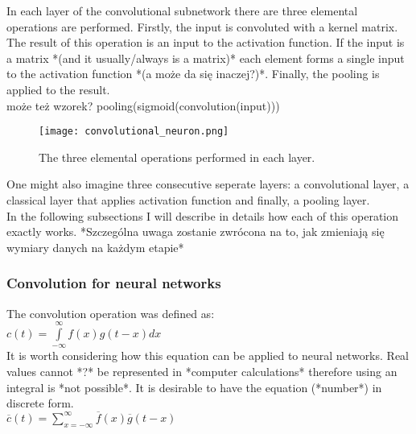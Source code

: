 \documentclass[a4paper,10pt]{report}
\begin{document}
	In each layer of the convolutional subnetwork there are three elemental operations are performed. Firstly, the input is convoluted with a kernel matrix. The result of this operation is an input to the activation function. If the input is a matrix *(and it usually/always is a matrix)* each element forms a single input to the activation function *(a może da się inaczej?)*. Finally, the pooling is applied to the result. \\
	
	może też wzorek? pooling(sigmoid(convolution(input))) \\ %
	
	\begin{figure}[h!]
	  \centering
	  \texttt{[image: convolutional\_neuron.png]}
	  \caption{The three elemental operations performed in each layer.}
	  \label{fig:con_neur}	%
	\end{figure} 
	  
	One might also imagine three consecutive seperate layers: a convolutional layer, a classical layer that applies activation function and finally, a pooling layer.\\
	
	In the following subsections I will describe in details how each of this operation exactly works. *Szczególna uwaga zostanie zwrócona na to, jak zmieniają się wymiary danych na każdym etapie*\\
		
	\subsubsection{Convolution for neural networks}%
	  The convolution operation was defined as: \\
	  
	  $c(t) = \int\limits_{-\infty}^\infty f(x)g(t-x)dx$ \\
	  
	  It is worth considering how this equation can be applied to neural networks. Real values cannot *?* be represented in *computer calculations* therefore using an integral is *not possible*. It is desirable to have the equation (*number*) in discrete form.\\
	  
	  $\overline{c}(t) = \sum\limits_{x = -\infty}^\infty \overline{f}(x)\overline{g}(t-x)$ \\%
	  
\end{document}
